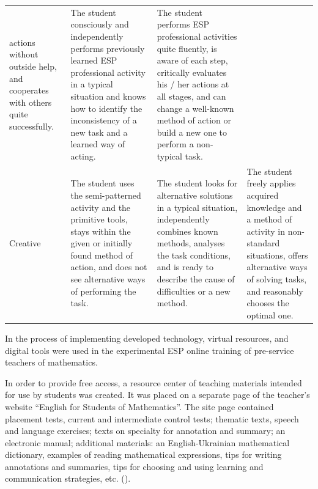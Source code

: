 \begin{table}[!htpb]
\begin{threeparttable}
\begin{tabular}{ l p{4cm} p{4cm} p{4cm}}
				actions without outside help, and cooperates with others quite
				successfully. & The student consciously and independently performs
				previously learned ESP professional activity in a typical situation and
				knows how to identify the inconsistency of a new task and a learned way
				of acting. & The student performs ESP professional activities quite
				fluently, is aware of each step, critically evaluates his / her actions
				at all stages, and can change a well-known method of action or build a
				new one to perform a non-typical task. \\
				Creative & The student uses the semi-patterned activity and the
				primitive tools, stays within the given or initially found method of
				action, and does not see alternative ways of performing the task. & The
				student looks for alternative solutions in a typical situation,
				independently combines known methods, analyses the task conditions, and
				is ready to describe the cause of difficulties or a new method. & The
				student freely applies acquired knowledge and a method of activity in
				non-standard situations, offers alternative ways of solving tasks, and
				reasonably chooses the optimal one. \\
				\bottomrule
            \end{tabular}
		\end{threeparttable}
	\end{table}

In the process of implementing developed technology, virtual resources,
and digital tools were used in the experimental ESP online training of
pre-service teachers of mathematics.

In order to provide free access, a resource center of teaching materials
intended for use by students was created. It was placed on a separate
page of the teacher's website \enquote{English for Students of Mathematics}.
The site page contained placement tests, current and intermediate
control tests; thematic texts, speech and language exercises; texts on
specialty for annotation and summary; an electronic manual; additional
materials: an English-Ukrainian mathematical dictionary, examples of
reading mathematical expressions, tips for writing annotations and
summaries, tips for choosing and using learning and communication
strategies, etc. ().

